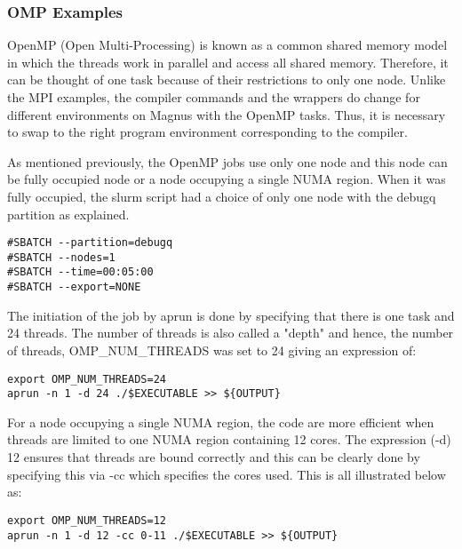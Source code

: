 \subsubsection{OMP Examples}

OpenMP (Open Multi-Processing) is known as a common shared memory model in which the threads work in parallel and access all shared memory. Therefore,
it can be thought of one task because of their restrictions to only one node. Unlike the MPI examples, the compiler commands and the wrappers do change 
for different environments on Magnus with the OpenMP tasks. Thus, it is necessary to swap to the right program environment corresponding to the compiler.

As mentioned previously, the OpenMP jobs use only one node and this node can be fully occupied node or a node occupying a single NUMA region. When it was 
fully occupied, the slurm script had a choice of only one node with the debugq partition as explained.

\begin{tcolorbox}
\begin{Verbatim}[fontsize=\scriptsize]
#SBATCH --partition=debugq
#SBATCH --nodes=1
#SBATCH --time=00:05:00
#SBATCH --export=NONE
\end{Verbatim}
\end{tcolorbox}

The initiation of the job by aprun is done by specifying that there is one task and 24 threads. The number of threads is also called a "depth" and hence,
the number of threads, OMP\_NUM\_THREADS was set to 24 giving an expression of:

\begin{tcolorbox}
\begin{Verbatim}[fontsize=\scriptsize]
export OMP_NUM_THREADS=24
aprun -n 1 -d 24 ./$EXECUTABLE >> ${OUTPUT}
\end{Verbatim}
\end{tcolorbox}

For a node occupying a single NUMA region, the code are more efficient when threads are limited to one NUMA region containing 12 cores. The expression 
(-d) 12 ensures that threads are bound correctly and this can be clearly done by specifying this via -cc which specifies the cores used. This is all 
illustrated below as:

\begin{tcolorbox}
\begin{Verbatim}[fontsize=\scriptsize]
export OMP_NUM_THREADS=12
aprun -n 1 -d 12 -cc 0-11 ./$EXECUTABLE >> ${OUTPUT}
\end{Verbatim}
\end{tcolorbox}

